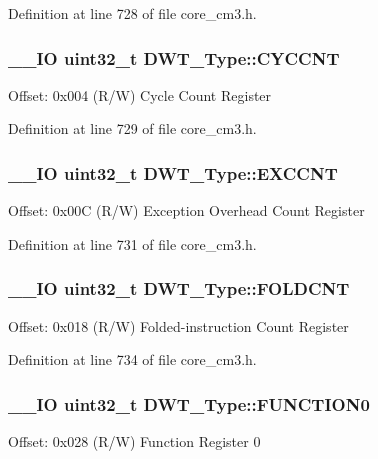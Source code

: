 Definition at line 728 of file core\-\_\-cm3.\-h.

\hypertarget{struct_d_w_t___type_a71680298e85e96e57002f87e7ab78fd4}{
\subsubsection[{C\-Y\-C\-C\-N\-T}]{\setlength{\rightskip}{0pt plus 5cm}\-\_\-\-\_\-\-I\-O {\bf uint32\-\_\-t} D\-W\-T\-\_\-\-Type\-::\-C\-Y\-C\-C\-N\-T}}\label{struct_d_w_t___type_a71680298e85e96e57002f87e7ab78fd4}
Offset\-: 0x004 (R/\-W) Cycle Count Register 

Definition at line 729 of file core\-\_\-cm3.\-h.

\hypertarget{struct_d_w_t___type_ac0801a2328f3431e4706fed91c828f82}{
\subsubsection[{E\-X\-C\-C\-N\-T}]{\setlength{\rightskip}{0pt plus 5cm}\-\_\-\-\_\-\-I\-O {\bf uint32\-\_\-t} D\-W\-T\-\_\-\-Type\-::\-E\-X\-C\-C\-N\-T}}\label{struct_d_w_t___type_ac0801a2328f3431e4706fed91c828f82}
Offset\-: 0x00\-C (R/\-W) Exception Overhead Count Register 

Definition at line 731 of file core\-\_\-cm3.\-h.

\hypertarget{struct_d_w_t___type_a35f2315f870a574e3e6958face6584ab}{
\subsubsection[{F\-O\-L\-D\-C\-N\-T}]{\setlength{\rightskip}{0pt plus 5cm}\-\_\-\-\_\-\-I\-O {\bf uint32\-\_\-t} D\-W\-T\-\_\-\-Type\-::\-F\-O\-L\-D\-C\-N\-T}}\label{struct_d_w_t___type_a35f2315f870a574e3e6958face6584ab}
Offset\-: 0x018 (R/\-W) Folded-\/instruction Count Register 

Definition at line 734 of file core\-\_\-cm3.\-h.

\hypertarget{struct_d_w_t___type_a5fbd9947d110cc168941f6acadc4a729}{
\subsubsection[{F\-U\-N\-C\-T\-I\-O\-N0}]{\setlength{\rightskip}{0pt plus 5cm}\-\_\-\-\_\-\-I\-O {\bf uint32\-\_\-t} D\-W\-T\-\_\-\-Type\-::\-F\-U\-N\-C\-T\-I\-O\-N0}}\label{struct_d_w_t___type_a5fbd9947d110cc168941f6acadc4a729}
Offset\-: 0x028 (R/\-W) Function Register 0 

